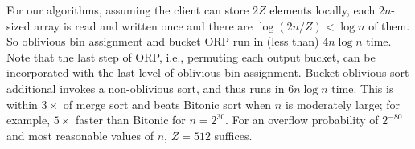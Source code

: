 For our algorithms, assuming the client can store $2Z$ elements locally, each $2n$-sized array is read and written once and there are $\log(2n/Z)<\log n$ of them.
So oblivious bin assignment and bucket ORP run in (less than) $4n\log n$ time.
Note that the last step of ORP, i.e., permuting each output bucket, can be incorporated with the last level of oblivious bin assignment.
Bucket oblivious sort additional invokes a non-oblivious sort, and thus runs in $6n\log n$ time. 
This is within $3\times$ of merge sort and beats Bitonic sort when $n$ is moderately large;
for example, $5\times$ faster than Bitonic for $n=2^{30}$.
For an overflow probability of $2^{-80}$ and most reasonable values of $n$, $Z = 512$ suffices. 


